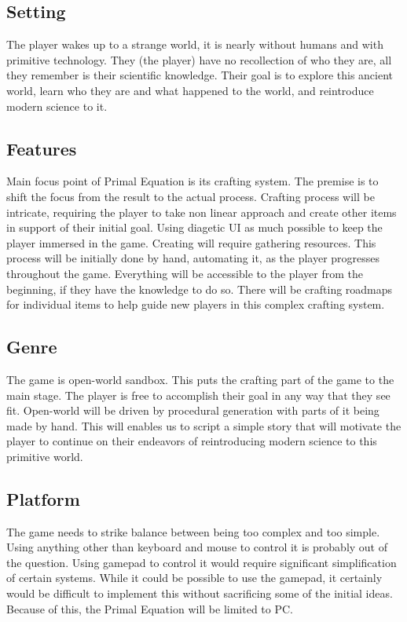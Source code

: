 \documentclass[a4paper,10pt,english]{article}
\begin{document}
\subsection*{Setting}
The player wakes up to a strange world, it is nearly without humans and with primitive technology. They (the player) have no recollection of who they are, all they remember is their scientific knowledge. Their goal is to explore this ancient world, learn who they are and what happened to the world, and reintroduce modern science to it.

\subsection*{Features}
Main focus point of Primal Equation is its crafting system. The premise is to shift the focus from the result to the actual process. Crafting process will be intricate, requiring the player to take non linear approach and create other items in support of their initial goal. Using diagetic UI as much possible to keep the player immersed in the game. Creating will require gathering resources. This process will be initially done by hand, automating it, as the player progresses throughout the game. Everything will be accessible to the player from the beginning, if they have the knowledge to do so. There will be crafting roadmaps for individual items to help guide new players in this complex crafting system.

\subsection*{Genre}
The game is open-world sandbox. This puts the crafting part of the game to the main stage. The player is free to accomplish their goal in any way that they see fit. Open-world will be driven by procedural generation with parts of it being made by hand. This will enables us to script a simple story that will motivate the player to continue on their endeavors of reintroducing modern science to this primitive world.

\subsection*{Platform}
The game needs to strike balance between being too complex and too simple. Using anything other than keyboard and mouse to control it is probably out of the question. Using gamepad to control it would require significant simplification of certain systems. While it could be possible to use the gamepad, it certainly would be difficult to implement this without sacrificing some of the initial ideas. Because of this, the Primal Equation will be limited to PC.
\end{document}

